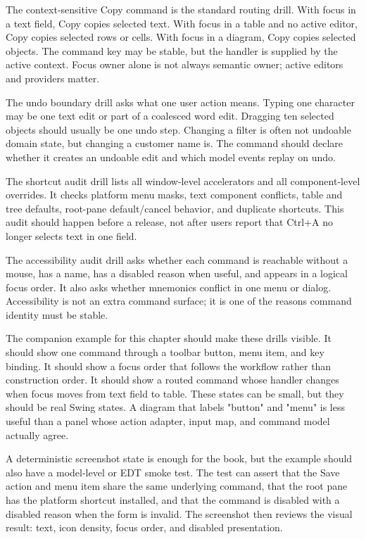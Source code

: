 The context-sensitive Copy command is the standard routing drill. With focus in a text field, Copy copies selected text. With focus in a table and no active editor, Copy copies selected rows or cells. With focus in a diagram, Copy copies selected objects. The command key may be stable, but the handler is supplied by the active context. Focus owner alone is not always semantic owner; active editors and providers matter.

The undo boundary drill asks what one user action means. Typing one character may be one text edit or part of a coalesced word edit. Dragging ten selected objects should usually be one undo step. Changing a filter is often not undoable domain state, but changing a customer name is. The command should declare whether it creates an undoable edit and which model events replay on undo.

The shortcut audit drill lists all window-level accelerators and all component-level overrides. It checks platform menu masks, text component conflicts, table and tree defaults, root-pane default/cancel behavior, and duplicate shortcuts. This audit should happen before a release, not after users report that Ctrl+A no longer selects text in one field.

The accessibility audit drill asks whether each command is reachable without a mouse, has a name, has a disabled reason when useful, and appears in a logical focus order. It also asks whether mnemonics conflict in one menu or dialog. Accessibility is not an extra command surface; it is one of the reasons command identity must be stable.

The companion example for this chapter should make these drills visible. It
should show one command through a toolbar button, menu item, and key binding. It
should show a focus order that follows the workflow rather than construction
order. It should show a routed command whose handler changes when focus moves
from text field to table. These states can be small, but they should be real
Swing states. A diagram that labels "button" and "menu" is less useful than a
panel whose action adapter, input map, and command model actually agree.

A deterministic screenshot state is enough for the book, but the example should
also have a model-level or EDT smoke test. The test can assert that the Save
action and menu item share the same underlying command, that the root pane has
the platform shortcut installed, and that the command is disabled with a
disabled reason when the form is invalid. The screenshot then reviews the
visual result: text, icon density, focus order, and disabled presentation.

